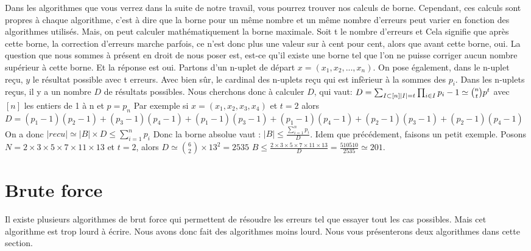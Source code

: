 \documentclass[a4paper, 11pt]{report}
\begin{document}
Dans les algorithmes que vous verrez dans la suite de notre travail, vous pourrez trouver nos calculs de borne. Cependant, ces calculs sont propres à chaque algorithme,
c'est à dire que la borne pour un même nombre et un même nombre d'erreurs peut varier en fonction des algorithmes utilisés. \newline
Mais, on peut calculer mathématiquement la borne maximale. \newline
Soit t le nombre d'erreurs et 
Cela signifie que après cette borne, la correction d'erreurs marche parfois, ce n'est donc plus une valeur sur à cent pour cent, alors que avant cette borne, oui.
\newline
La question que nous sommes à présent en droit de nous poser est, est-ce qu'il existe une borne tel que l'on ne puisse corriger aucun nombre supérieur à cette borne. Et la réponse est oui.
Partons d'un n-uplet de départ $x=(x_1, x_2, ..., x_n)$. On pose également, dans le n-uplet reçu, $y$ le résultat possible avec t erreurs. Avec bien sûr, le cardinal des n-uplets reçu qui est infèrieur à la sommes des $p_i$. Dans les n-uplets reçus, il y a un nombre $D$ de résultats possibles. Nous cherchons donc à calculer $D$, qui vaut: \newline
$D=\sum_{I \subset  [n]  \newline |I|=t  }  \prod _{i \in I} p_i - 1 \simeq  \binom{n}{t} p^t  $ avec $[n]$ les entiers de 1 à n et $p=p_n$\newline
Par exemple si $x=(x_1, x_2, x_3, x_4)$ et $t=2$ alors $D=(p_1-1)(p_2-1)+(p_3-1)(p_4-1)+(p_1-1)(p_3-1)+(p_1-1)(p_4-1)+(p_2-1)(p_3-1)+(p_2-1)(p_4-1)$ \newline
On a donc $ |recu| \simeq |B| \times D\leq \sum_{i = 1}^{n} p_i  $ \newline
Donc la borne absolue vaut : $|B| \leq  \frac{\sum_{i= 1}^{n} p_i }{D} $.\newline
Idem que précédement, faisons un petit exemple. \newline
Posons $N=2\times 3\times 5\times 7\times 11\times 13$ et $t=2$, alors $D\simeq \binom{6}{2}\times 13^2=2535$
$B \leq  \frac{2\times 3\times 5\times 7\times 11\times 13}{D}=\frac{510510}{2535} \simeq 201 $.


\newpage

\chapter{Brute force}

Il existe plusieurs algorithmes de brut force qui permettent de résoudre les erreurs tel que essayer tout les cas possibles. Mais cet algorithme est trop lourd à écrire. Nous avons donc fait des algorithmes moins lourd.
Nous vous présenterons deux algorithmes dans cette section.
\end{document}

